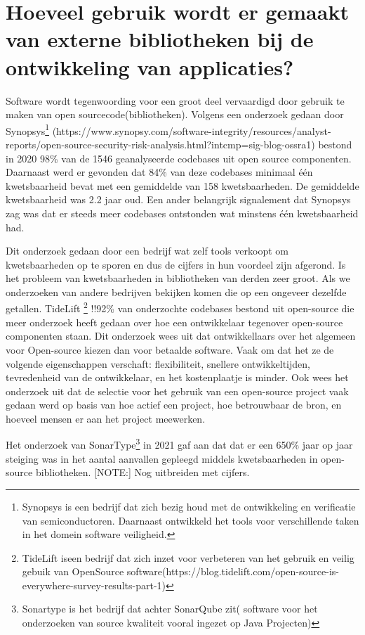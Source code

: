 \section{Hoeveel gebruik wordt er gemaakt van externe bibliotheken bij de ontwikkeling van applicaties?}\label{sec:hoeveel-gebruik-wordt-er-gemaakt-van-externe-bibliotheken-bij-de-ontwikkeling-van-applicaties?}
Software wordt tegenwoording voor een groot deel vervaardigd door gebruik te maken van open source\-code(bibliotheken). Volgens een onderzoek gedaan door Synopsys\footnote{Synopsys is een bedrijf dat zich bezig houd met de ontwikkeling en verificatie van semiconductoren. Daarnaast ontwikkeld het tools voor verschillende taken in het domein software veiligheid.} (https://www.synopsy.com/software-integrity/resources/analyst-reports/open-source-security-risk-analysis.html?intcmp=sig-blog-ossra1) bestond in 2020 98\% van de 1546 geanalyseerde codebases uit open source componenten. Daarnaast werd er gevonden dat 84\% van deze codebases minimaal één kwetsbaarheid bevat met een gemiddelde van 158 kwetsbaarheden. De gemiddelde kwetsbaarheid was 2.2 jaar oud. Een ander belangrijk signalement dat Synopsys zag was dat er steeds meer codebases ontstonden wat minstens één kwetsbaarheid had.

Dit onderzoek gedaan door een bedrijf wat zelf tools verkoopt om kwetsbaarheden op te sporen en dus de cijfers in hun voordeel zijn afgerond. Is het probleem van kwetsbaarheden in bibliotheken van derden zeer groot. Als we onderzoeken van andere bedrijven bekijken komen die op een ongeveer dezelfde getallen. TideLift
\footnote{TideLift iseen bedrijf dat zich inzet voor verbeteren van het gebruik en veilig gebuik van OpenSource software(https://blog.tidelift.com/open-source-is-everywhere-survey-results-part-1)} !!92\% van onderzochte codebases bestond uit open-source
die meer onderzoek heeft gedaan over hoe een ontwikkelaar tegenover open-source componenten staan. Dit onderzoek wees uit dat ontwikkellaars over het algemeen voor Open-source kiezen dan voor betaalde software. Vaak om dat het ze de volgende eigenschappen verschaft:  flexibiliteit, snellere ontwikkeltijden, tevredenheid van de ontwikkelaar, en het kostenplaatje is minder. Ook wees het onderzoek uit dat de selectie voor het gebruik van een open-source project vaak gedaan werd op basis van hoe actief een project, hoe betrouwbaar de bron, en hoeveel mensen er aan het project meewerken.

Het onderzoek van SonarType\footnote{Sonartype is het bedrijf dat achter SonarQube zit( software voor het onderzoeken van source kwaliteit vooral ingezet op Java Projecten)} in 2021 gaf aan dat dat er een 650\% jaar op jaar steiging was in het aantal aanvallen gepleegd middels kwetsbaarheden in open-source bibliotheken.
[NOTE:] Nog uitbreiden met cijfers.

